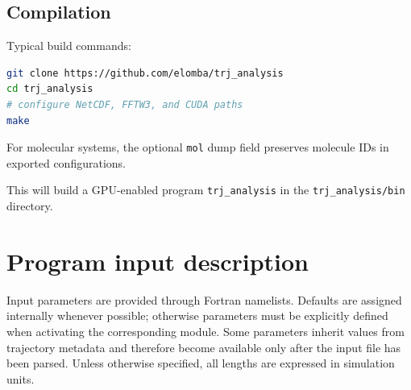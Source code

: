 \documentclass[final,1p,times]{elsarticle}
\begin{document}
\subsection{Compilation}
Typical build commands:
\begin{lstlisting}[language=bash]
git clone https://github.com/elomba/trj_analysis
cd trj_analysis
# configure NetCDF, FFTW3, and CUDA paths
make
\end{lstlisting}
For molecular systems, the optional \texttt{mol} dump field preserves molecule IDs in exported configurations.

This will build a GPU-enabled program \texttt{trj\_analysis} in the
\texttt{trj\_analysis/bin}  directory.


\section{Program input description}

Input parameters are provided through Fortran namelists. Defaults are assigned internally whenever possible; otherwise parameters must be explicitly defined when activating the corresponding module. Some parameters inherit values from trajectory metadata and therefore become available only after the input file has been parsed. Unless otherwise specified, all lengths are expressed in simulation units.
\end{document}
